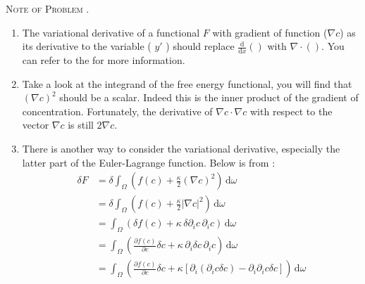 \documentclass[12pt, a4paper, oneside]{article}
\newcommand{\bhref}[2]{
    \href{#1}{\color{blue}{#2}}
}
\newcounter{problemname}
\newenvironment{note}{\begin{notecolorbox}
    \par\noindent\textsc{Note of Problem \arabic{problemname}. }}
    {\end{notecolorbox}\par}
\begin{document}
\begin{note}
    \begin{enumerate}
        \item The variational derivative of a functional \(F\) with gradient of function (\(\nabla{c}\))  as its derivative to the variable ( \(y'\) ) should
              replace \( \frac{\mathrm{d} }{\mathrm{d} x}()\) with \(\nabla \cdot()\).
              You can refer to the \bhref{https://en.wikipedia.org/wiki/Functional_derivative\#Formula}{Wiki} for more information.
        \item Take a look at the integrand of the free energy functional, you will find that \(\left( \nabla c \right)^2\) should be a scalar. Indeed this is the inner
              product of the gradient of concentration. Fortunately, the derivative of \(\nabla c \cdot \nabla c \) with respect to the vector \(\nabla c\) is still \(2\nabla c\).
        \item There is another way to consider the variational derivative, especially the latter part of the Euler-Lagrange function. Below is from \bhref{https://blog.csdn.net/kuailezhizi1996/article/details/129011165}{this blog}:
              \begin{align*}
                  \delta F & = \delta \int_{\Omega} \left(  f(c) + \frac{\kappa}{2}\left( \nabla c \right)^2\right) \,\mathrm{d}\omega                                                                                               \\
                           & = \delta \int_{\Omega} \left(  f(c) + \frac{\kappa}{2}\left|\nabla c \right|^2 \right) \,\mathrm{d}\omega                                                                                               \\
                           & = \int_{\Omega} \left( \delta f(c) + \kappa\,\delta\partial_i c\, \partial_i c \right) \,\mathrm{d}\omega                                                                                               \\
                           & = \int_{\Omega} \left(  \frac{\partial f(c)}{\partial c} \delta c + \kappa\,\partial_i\delta c\, \partial_i c \right) \,\mathrm{d}\omega                                                                \\
                           & = \int_{\Omega} \left( \frac{\partial f(c)}{\partial c} \delta c + \kappa\left[ \partial_i (\partial_i c \delta c) - \partial_i \partial_i c \delta c \right] \right) \,\mathrm{d}\omega                \\

\end{align*}
\end{enumerate}
\end{note}
\end{document}
